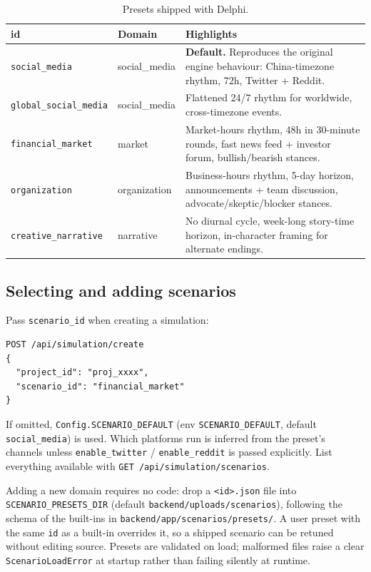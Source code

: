 \documentclass[11pt,a4paper]{article}
\begin{document}
\begin{table}[H]
\centering
\begin{tabularx}{\textwidth}{@{}l l X@{}}
\toprule
\textbf{id} & \textbf{Domain} & \textbf{Highlights} \\
\midrule
\texttt{social\_media} & social\_media & \textbf{Default.} Reproduces the original engine behaviour: China-timezone rhythm, 72h, Twitter + Reddit. \\
\texttt{global\_social\_media} & social\_media & Flattened 24/7 rhythm for worldwide, cross-timezone events. \\
\texttt{financial\_market} & market & Market-hours rhythm, 48h in 30-minute rounds, fast news feed + investor forum, bullish/bearish stances. \\
\texttt{organization} & organization & Business-hours rhythm, 5-day horizon, announcements + team discussion, advocate/skeptic/blocker stances. \\
\texttt{creative\_narrative} & narrative & No diurnal cycle, week-long story-time horizon, in-character framing for alternate endings. \\
\bottomrule
\end{tabularx}
\caption{Presets shipped with Delphi.}
\end{table}

\subsection{Selecting and adding scenarios}

Pass \texttt{scenario\_id} when creating a simulation:

\begin{lstlisting}
POST /api/simulation/create
{
  "project_id": "proj_xxxx",
  "scenario_id": "financial_market"
}
\end{lstlisting}

If omitted, \texttt{Config.SCENARIO\_DEFAULT} (env \texttt{SCENARIO\_DEFAULT},
default \texttt{social\_media}) is used. Which platforms run is inferred from the
preset's channels unless \texttt{enable\_twitter} / \texttt{enable\_reddit} is
passed explicitly. List everything available with
\texttt{GET /api/simulation/scenarios}.

Adding a new domain requires no code: drop a \texttt{<id>.json} file into
\texttt{SCENARIO\_PRESETS\_DIR} (default \texttt{backend/uploads/scenarios}),
following the schema of the built-ins in
\texttt{backend/app/scenarios/presets/}. A user preset with the same \texttt{id}
as a built-in overrides it, so a shipped scenario can be retuned without editing
source. Presets are validated on load; malformed files raise a clear
\texttt{ScenarioLoadError} at startup rather than failing silently at runtime.
\end{document}
